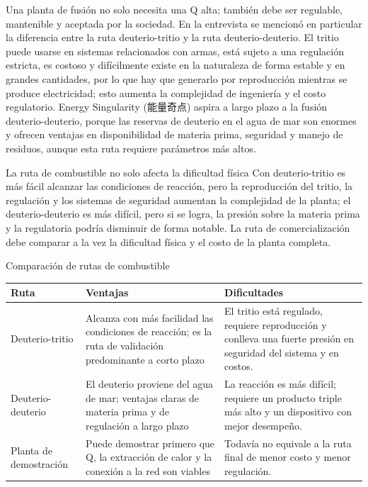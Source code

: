 Una planta de fusión no solo necesita una Q alta; también debe ser regulable, mantenible y aceptada por la sociedad. En la entrevista se mencionó en particular la diferencia entre la ruta deuterio-tritio y la ruta deuterio-deuterio. El tritio puede usarse en sistemas relacionados con armas, está sujeto a una regulación estricta, es costoso y difícilmente existe en la naturaleza de forma estable y en grandes cantidades, por lo que hay que generarlo por reproducción mientras se produce electricidad; esto aumenta la complejidad de ingeniería y el costo regulatorio. Energy Singularity (能量奇点) aspira a largo plazo a la fusión deuterio-deuterio, porque las reservas de deuterio en el agua de mar son enormes y ofrecen ventajas en disponibilidad de materia prima, seguridad y manejo de residuos, aunque esta ruta requiere parámetros más altos.

\begin{warningbox}{La ruta de combustible no solo afecta la dificultad física}
Con deuterio-tritio es más fácil alcanzar las condiciones de reacción, pero la reproducción del tritio, la regulación y los sistemas de seguridad aumentan la complejidad de la planta; el deuterio-deuterio es más difícil, pero si se logra, la presión sobre la materia prima y la regulatoria podría disminuir de forma notable. La ruta de comercialización debe comparar a la vez la dificultad física y el costo de la planta completa.
\end{warningbox}

\begin{knowledgebox}{Comparación de rutas de combustible}
\begin{tabularx}{\textwidth}{p{}p{}X}
\toprule
Ruta & Ventajas & Dificultades \\
\midrule
Deuterio-tritio & Alcanza con más facilidad las condiciones de reacción; es la ruta de validación predominante a corto plazo & El tritio está regulado, requiere reproducción y conlleva una fuerte presión en seguridad del sistema y en costos. \\
Deuterio-deuterio & El deuterio proviene del agua de mar; ventajas claras de materia prima y de regulación a largo plazo & La reacción es más difícil; requiere un producto triple más alto y un dispositivo con mejor desempeño. \\
Planta de demostración & Puede demostrar primero que Q, la extracción de calor y la conexión a la red son viables & Todavía no equivale a la ruta final de menor costo y menor regulación. \\
\bottomrule
\end{tabularx}
\end{knowledgebox}

